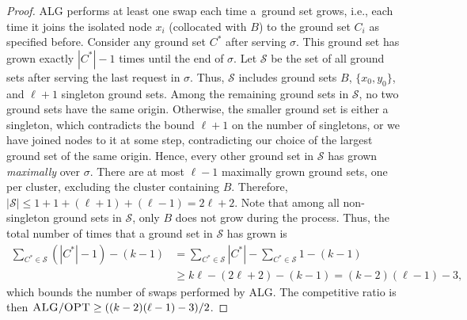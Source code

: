 \documentclass[a4paper,anonymous,USenglish]{lipics-v2019}
\newcommand{\OPT}{\textsc{OPT}\xspace}
\newcommand{\ALG}{\textsc{ALG}\xspace}
\begin{document}
\begin{proof}
	\ALG performs at least one swap each time a~ground set grows,
	i.e., each time it joins the isolated node $x_i$ (collocated with $B$) to  the ground set $C_i$ as specified before.
	Consider any ground set $C^*$ after serving $\sigma$.
	This ground set has grown exactly $|C^*|-1$ times until the end of $\sigma$. 
	Let $\mathcal{S}$ be the set of all ground sets after serving the last request in $\sigma$.
	Thus, $\mathcal{S}$ includes ground sets $B$,
	$\{x_0,y_0\}$,
	and $\ell+1$ singleton ground sets.
	Among the remaining ground sets in $\mathcal{S}$,
	no two ground sets have the same origin.
	Otherwise,
   the smaller ground set is either a singleton,
   which contradicts the bound $\ell+1$ on the number of singletons,
	or we have joined nodes to it at some step,
	contradicting our choice of the largest ground set of the same origin.
	Hence, every  other ground set in
	$\mathcal{S}$ has grown \emph{maximally} over $\sigma$.
	There are at most $\ell-1$ maximally grown ground sets,
	one per cluster,
	 excluding the cluster containing $B$. 
	Therefore,  $|\mathcal{S}| \leq 1 + 1 + (\ell+1)  + (\ell-1) = 2\ell+2$.
	Note that among all non-singleton ground sets in $\mathcal{S}$,
	 only $B$ does not grow during the process.
	 Thus,
    the total number of times that 
	a ground set in $\mathcal{S}$  has grown is
	\begin{align*}
	\sum_{C^* \in \mathcal{S} } (|C^*|-1) - (k-1) &= 
	\sum_{C^* \in \mathcal{S} } |C^*| - 
		\sum_{C^* \in \mathcal{S} } 1 - (k-1) \\
	&\geq  k  \ell - (2\ell+2) - (k-1) =  (k-2)(\ell-1) - 3,
	\end{align*}
	which bounds the number of swaps performed by \ALG.
	The competitive ratio is then
	$\ALG / \OPT \geq ((k-2)(\ell-1) - 3) / 2$.

\end{proof}
\end{document}
